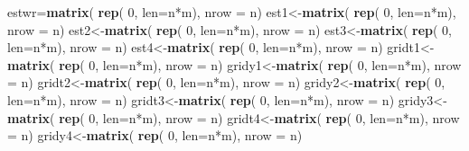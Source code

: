 \documentclass[12pt,twoside, a4paper]{reedthesis}
\newenvironment{Shaded}{}{}
\newcommand{\DataTypeTok}[1]{\textcolor[rgb]{0.56,0.13,0.00}{#1}}
\newcommand{\DecValTok}[1]{\textcolor[rgb]{0.25,0.63,0.44}{#1}}
\newcommand{\KeywordTok}[1]{\textcolor[rgb]{0.00,0.44,0.13}{\textbf{#1}}}
\newcommand{\NormalTok}[1]{#1}
\newcommand{\OperatorTok}[1]{\textcolor[rgb]{0.40,0.40,0.40}{#1}}
\begin{document}
\begin{Shaded}
\begin{Highlighting}[]
\NormalTok{  estwr=}\KeywordTok{matrix}\NormalTok{( }\KeywordTok{rep}\NormalTok{( }\DecValTok{0}\NormalTok{, }\DataTypeTok{len=}\NormalTok{n}\OperatorTok{*}\NormalTok{m), }\DataTypeTok{nrow =}\NormalTok{ n)}
\NormalTok{  est1<-}\KeywordTok{matrix}\NormalTok{( }\KeywordTok{rep}\NormalTok{( }\DecValTok{0}\NormalTok{, }\DataTypeTok{len=}\NormalTok{n}\OperatorTok{*}\NormalTok{m), }\DataTypeTok{nrow =}\NormalTok{ n)}
\NormalTok{  est2<-}\KeywordTok{matrix}\NormalTok{( }\KeywordTok{rep}\NormalTok{( }\DecValTok{0}\NormalTok{, }\DataTypeTok{len=}\NormalTok{n}\OperatorTok{*}\NormalTok{m), }\DataTypeTok{nrow =}\NormalTok{ n)}
\NormalTok{  est3<-}\KeywordTok{matrix}\NormalTok{( }\KeywordTok{rep}\NormalTok{( }\DecValTok{0}\NormalTok{, }\DataTypeTok{len=}\NormalTok{n}\OperatorTok{*}\NormalTok{m), }\DataTypeTok{nrow =}\NormalTok{ n)}
\NormalTok{  est4<-}\KeywordTok{matrix}\NormalTok{( }\KeywordTok{rep}\NormalTok{( }\DecValTok{0}\NormalTok{, }\DataTypeTok{len=}\NormalTok{n}\OperatorTok{*}\NormalTok{m), }\DataTypeTok{nrow =}\NormalTok{ n)}
\NormalTok{  gridt1<-}\KeywordTok{matrix}\NormalTok{( }\KeywordTok{rep}\NormalTok{( }\DecValTok{0}\NormalTok{, }\DataTypeTok{len=}\NormalTok{n}\OperatorTok{*}\NormalTok{m), }\DataTypeTok{nrow =}\NormalTok{ n)}
\NormalTok{  gridy1<-}\KeywordTok{matrix}\NormalTok{( }\KeywordTok{rep}\NormalTok{( }\DecValTok{0}\NormalTok{, }\DataTypeTok{len=}\NormalTok{n}\OperatorTok{*}\NormalTok{m), }\DataTypeTok{nrow =}\NormalTok{ n)}
\NormalTok{  gridt2<-}\KeywordTok{matrix}\NormalTok{( }\KeywordTok{rep}\NormalTok{( }\DecValTok{0}\NormalTok{, }\DataTypeTok{len=}\NormalTok{n}\OperatorTok{*}\NormalTok{m), }\DataTypeTok{nrow =}\NormalTok{ n)}
\NormalTok{  gridy2<-}\KeywordTok{matrix}\NormalTok{( }\KeywordTok{rep}\NormalTok{( }\DecValTok{0}\NormalTok{, }\DataTypeTok{len=}\NormalTok{n}\OperatorTok{*}\NormalTok{m), }\DataTypeTok{nrow =}\NormalTok{ n)}
\NormalTok{  gridt3<-}\KeywordTok{matrix}\NormalTok{( }\KeywordTok{rep}\NormalTok{( }\DecValTok{0}\NormalTok{, }\DataTypeTok{len=}\NormalTok{n}\OperatorTok{*}\NormalTok{m), }\DataTypeTok{nrow =}\NormalTok{ n)}
\NormalTok{  gridy3<-}\KeywordTok{matrix}\NormalTok{( }\KeywordTok{rep}\NormalTok{( }\DecValTok{0}\NormalTok{, }\DataTypeTok{len=}\NormalTok{n}\OperatorTok{*}\NormalTok{m), }\DataTypeTok{nrow =}\NormalTok{ n)}
\NormalTok{  gridt4<-}\KeywordTok{matrix}\NormalTok{( }\KeywordTok{rep}\NormalTok{( }\DecValTok{0}\NormalTok{, }\DataTypeTok{len=}\NormalTok{n}\OperatorTok{*}\NormalTok{m), }\DataTypeTok{nrow =}\NormalTok{ n)}
\NormalTok{  gridy4<-}\KeywordTok{matrix}\NormalTok{( }\KeywordTok{rep}\NormalTok{( }\DecValTok{0}\NormalTok{, }\DataTypeTok{len=}\NormalTok{n}\OperatorTok{*}\NormalTok{m), }\DataTypeTok{nrow =}\NormalTok{ n)}
  

\end{Highlighting}
\end{Shaded}
\end{document}
